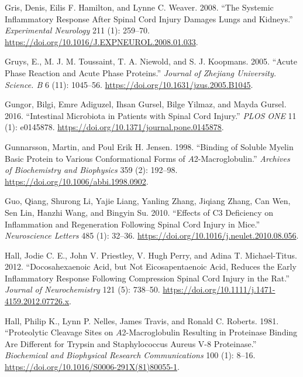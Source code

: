 \documentclass[9pt,lineno]{elife}
\newlength{\cslhangindent}
\newlength{\cslentryspacingunit} %
\newenvironment{CSLReferences}[2] %
 {%
  \setlength{\parindent}{0pt}
  \ifodd #1
  \let\oldpar\par
  \def\par{\hangindent=\cslhangindent\oldpar}
  \fi
  \setlength{\parskip}{#2\cslentryspacingunit}
 }%
 {}
\begin{document}
\begin{landscape}
\begin{landscape}
\begin{landscape}
\begin{landscape}
\begin{CSLReferences}{1}{0}
\leavevmode{}%
Gris, Denis, Eilis F. Hamilton, and Lynne C. Weaver. 2008. {``The Systemic Inflammatory Response After Spinal Cord Injury Damages Lungs and Kidneys.''} \emph{Experimental Neurology} 211 (1): 259--70. \url{https://doi.org/10.1016/J.EXPNEUROL.2008.01.033}.

\leavevmode{}%
Gruys, E., M. J. M. Toussaint, T. A. Niewold, and S. J. Koopmans. 2005. {``Acute Phase Reaction and Acute Phase Proteins.''} \emph{Journal of Zhejiang University. Science. B} 6 (11): 1045--56. \url{https://doi.org/10.1631/jzus.2005.B1045}.

\leavevmode{}%
Gungor, Bilgi, Emre Adiguzel, Ihsan Gursel, Bilge Yilmaz, and Mayda Gursel. 2016. {``Intestinal {Microbiota} in {Patients} with {Spinal Cord Injury}.''} \emph{PLOS ONE} 11 (1): e0145878. \url{https://doi.org/10.1371/journal.pone.0145878}.

\leavevmode{}%
Gunnarsson, Martin, and Poul Erik H. Jensen. 1998. {``Binding of {Soluble Myelin Basic Protein} to {Various Conformational Forms} of {\(A\)}2-{Macroglobulin}.''} \emph{Archives of Biochemistry and Biophysics} 359 (2): 192--98. \url{https://doi.org/10.1006/abbi.1998.0902}.

\leavevmode{}%
Guo, Qiang, Shurong Li, Yajie Liang, Yanling Zhang, Jiqiang Zhang, Can Wen, Sen Lin, Hanzhi Wang, and Bingyin Su. 2010. {``Effects of {C3} Deficiency on Inflammation and Regeneration Following Spinal Cord Injury in Mice.''} \emph{Neuroscience Letters} 485 (1): 32--36. \url{https://doi.org/10.1016/j.neulet.2010.08.056}.

\leavevmode{}%
Hall, Jodie C. E., John V. Priestley, V. Hugh Perry, and Adina T. Michael-Titus. 2012. {``Docosahexaenoic Acid, but Not Eicosapentaenoic Acid, Reduces the Early Inflammatory Response Following Compression Spinal Cord Injury in the Rat.''} \emph{Journal of Neurochemistry} 121 (5): 738--50. \url{https://doi.org/10.1111/j.1471-4159.2012.07726.x}.

\leavevmode{}%
Hall, Philip K., Lynn P. Nelles, James Travis, and Ronald C. Roberts. 1981. {``Proteolytic Cleavage Sites on {\(A\)}2-Macroglobulin Resulting in Proteinase Binding Are Different for Trypsin and Staphylococcus Aureus {V-8} Proteinase.''} \emph{Biochemical and Biophysical Research Communications} 100 (1): 8--16. \url{https://doi.org/10.1016/S0006-291X(81)80055-1}.


\end{CSLReferences}
\end{landscape}
\end{landscape}
\end{landscape}
\end{landscape}
\end{document}
